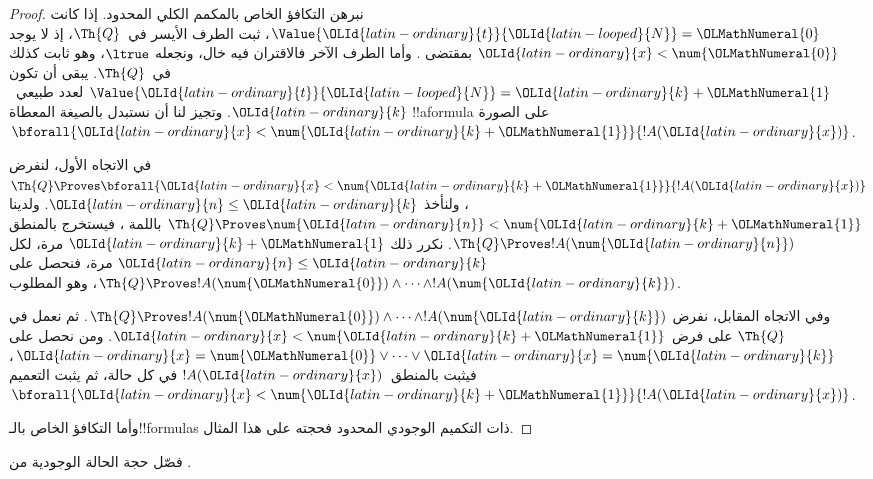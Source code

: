\documentclass[../../../include/open-logic-section]{subfiles}
\begin{document}
\begin{proof}
نبرهن التكافؤ الخاص بالمكمم الكلي المحدود.
إذا كانت $\Value{{\OLId{latin-ordinary}{t}}}{{\OLId{latin-looped}{N}}}={\OLMathNumeral{0}}$، ثبت الطرف الأيسر في~$\Th{Q}$،
إذ لا يوجد ${\OLId{latin-ordinary}{x}}<\num {\OLMathNumeral{0}}$ بمقتضى
.
وأما الطرف الآخر فالاقتران فيه خال، ونجعله $\ltrue$،
وهو ثابت كذلك في~$\Th{Q}$.
%
يبقى أن تكون $\Value{{\OLId{latin-ordinary}{t}}}{{\OLId{latin-looped}{N}}}={\OLId{latin-ordinary}{k}}+{\OLMathNumeral{1}}$ لعدد طبيعي~${\OLId{latin-ordinary}{k}}$.
وتجيز لنا  أن نستبدل بالصيغة المعطاة
!!a{formula} على الصورة $\bforall{{\OLId{latin-ordinary}{x}}<\num{{\OLId{latin-ordinary}{k}}+{\OLMathNumeral{1}}}}{!A({\OLId{latin-ordinary}{x}})}$.

في الاتجاه الأول، لنفرض
$\Th{Q}\Proves\bforall{{\OLId{latin-ordinary}{x}}<\num{{\OLId{latin-ordinary}{k}}+{\OLMathNumeral{1}}}}{!A({\OLId{latin-ordinary}{x}})}$،
ولنأخذ ${\OLId{latin-ordinary}{n}}\leq {\OLId{latin-ordinary}{k}}$.
ولدينا $\Th{Q}\Proves\num {\OLId{latin-ordinary}{n}}<\num{{\OLId{latin-ordinary}{k}}+{\OLMathNumeral{1}}}$
باللمة ،
فيستخرج بالمنطق $\Th{Q}\Proves !A(\num {\OLId{latin-ordinary}{n}})$.
نكرر ذلك ${\OLId{latin-ordinary}{k}}+{\OLMathNumeral{1}}$ مرة، لكل ${\OLId{latin-ordinary}{n}}\leq {\OLId{latin-ordinary}{k}}$ مرة،
فنحصل على $\Th{Q}\Proves !A(\num {\OLMathNumeral{0}})\land\dots\land !A(\num {\OLId{latin-ordinary}{k}})$،
وهو المطلوب.

وفي الاتجاه المقابل، نفرض
$\Th{Q}\Proves !A(\num {\OLMathNumeral{0}})\land\dots\land !A(\num {\OLId{latin-ordinary}{k}})$.
ثم نعمل في $\Th{Q}$ على فرض ${\OLId{latin-ordinary}{x}}<\num{{\OLId{latin-ordinary}{k}}+{\OLMathNumeral{1}}}$.
ومن  نحصل على
${\OLId{latin-ordinary}{x}}=\num {\OLMathNumeral{0}}\lor\dots\lor {\OLId{latin-ordinary}{x}}=\num {\OLId{latin-ordinary}{k}}$،
فيثبت بالمنطق~$!A({\OLId{latin-ordinary}{x}})$ في كل حالة، ثم يثبت التعميم
$\bforall{{\OLId{latin-ordinary}{x}}<\num{{\OLId{latin-ordinary}{k}}+{\OLMathNumeral{1}}}}{!A({\OLId{latin-ordinary}{x}})}$.

وأما التكافؤ الخاص بالـ!!{formula}s ذات التكميم الوجودي المحدود
فحجته على هذا المثال.
\end{proof}

\begin{prob}
فصّل حجة الحالة الوجودية من
.
\end{prob}
\end{document}
